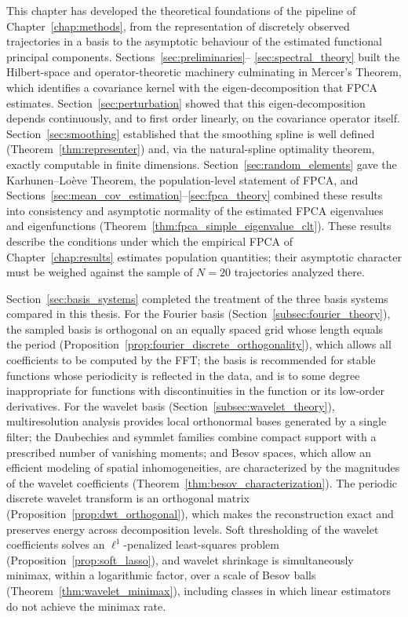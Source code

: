 This chapter has developed the theoretical foundations of the pipeline of
Chapter~\ref{chap:methods}, from the representation of discretely observed
trajectories in a basis to the asymptotic behaviour of the estimated
functional principal components. Sections~\ref{sec:preliminaries}--%
\ref{sec:spectral_theory} built the Hilbert-space and operator-theoretic
machinery culminating in Mercer's Theorem, which identifies a covariance
kernel with the eigen-decomposition that FPCA estimates.
Section~\ref{sec:perturbation} showed that this eigen-decomposition depends
continuously, and to first order linearly, on the covariance operator
itself. Section~\ref{sec:smoothing} established that the smoothing spline is
well defined (Theorem~\ref{thm:representer}) and, via the natural-spline
optimality theorem, exactly computable in finite dimensions.
Section~\ref{sec:random_elements} gave the Karhunen--Lo\`eve Theorem, the
population-level statement of FPCA, and
Sections~\ref{sec:mean_cov_estimation}--\ref{sec:fpca_theory} combined these
results into consistency and asymptotic normality of the estimated FPCA
eigenvalues and eigenfunctions (Theorem~\ref{thm:fpca_simple_eigenvalue_clt}).
These results describe the conditions under which the empirical FPCA of
Chapter~\ref{chap:results} estimates population quantities; their asymptotic
character must be weighed against the sample of $N = 20$ trajectories
analyzed there.

Section~\ref{sec:basis_systems} completed the treatment of the three basis
systems compared in this thesis. For the Fourier basis
(Section~\ref{subsec:fourier_theory}), the sampled basis is orthogonal on an
equally spaced grid whose length equals the period
(Proposition~\ref{prop:fourier_discrete_orthogonality}), which allows all
coefficients to be computed by the FFT; the basis is recommended for stable
functions whose periodicity is reflected in the data, and is to some degree
inappropriate for functions with discontinuities in the function or its
low-order derivatives. For the wavelet basis
(Section~\ref{subsec:wavelet_theory}), multiresolution analysis provides local
orthonormal bases generated by a single filter; the Daubechies and symmlet
families combine compact support with a prescribed number of vanishing
moments; and Besov spaces, which allow an efficient modeling of spatial
inhomogeneities, are characterized by the magnitudes of the wavelet
coefficients (Theorem~\ref{thm:besov_characterization}). The periodic
discrete wavelet transform is an orthogonal matrix
(Proposition~\ref{prop:dwt_orthogonal}), which makes the reconstruction exact
and preserves energy across decomposition levels. Soft thresholding of the
wavelet coefficients solves an $\ell^1$-penalized least-squares problem
(Proposition~\ref{prop:soft_lasso}), and wavelet shrinkage is simultaneously
minimax, within a logarithmic factor, over a scale of Besov balls
(Theorem~\ref{thm:wavelet_minimax}), including classes in which linear
estimators do not achieve the minimax rate.

